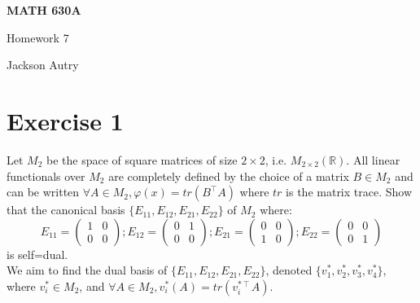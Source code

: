 \documentclass[12pt,a4paper]{article}
\author{Jackson Autry}
\newcommand{\R}{\mathbb{R}}
\theoremstyle{plain}
\theoremstyle{remark}
\theoremstyle{definition}
\begin{document}

	
\begin{center}
	\textbf{MATH 630A} %
	
		Homework 7	%
		
		Jackson Autry
\end{center}

\section*{Exercise 1}
	\noindent Let $M_2$ be the space of square matrices of size $2\times2$, i.e. $M_{2\times 2}(\R)$. All linear functionals over $M_2$ are completely defined by the choice of a matrix $B \in M_2$ and can be written $\forall A\in M_2, \varphi(x) = tr(B^{\intercal}A)$ where $tr$ is the matrix trace. Show that the canonical basis $\{E_{11},E_{12},E_{21},E_{22}\}$ of $M_2$ where:
	$$E_{11} = \begin{pmatrix}
	1 & 0 \\ 0 & 0 
	\end{pmatrix}
	;
	E_{12} = \begin{pmatrix}
	0 & 1 \\ 0 & 0 
	\end{pmatrix}
	;
	E_{21} = \begin{pmatrix}
	0 & 0 \\ 1 & 0 
	\end{pmatrix}
	;
	E_{22} = \begin{pmatrix}
	0 & 0 \\ 0 & 1
	\end{pmatrix}
	$$
	is self=dual.\\
	
	We aim to find the dual basis of $\{E_{11},E_{12},E_{21},E_{22}\}$, denoted $\{v_1^*,v_2^*,v_3^*,v_4^*\}$, where $v_i^* \in M_2$, and $\forall A \in M_2, v_i^*(A) = tr(v_i^{*\intercal}A)$.
	
\end{document}
